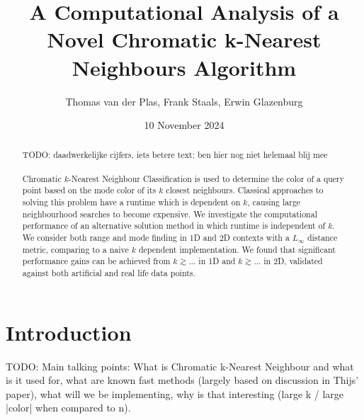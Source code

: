\documentclass{article}
\title{A Computational Analysis of a Novel Chromatic k-Nearest Neighbours Algorithm}
\author{Thomas van der Plas, Frank Staals, Erwin Glazenburg}
\date{10 November 2024}
\begin{document}
\maketitle

\begin{abstract}
    \noindent TODO: daadwerkelijke cijfers, iets betere text; ben hier nog niet helemaal blij mee \\\\
    Chromatic $k$-Nearest Neighbour Classification is used to determine the color of a query point based on the mode color of its $k$ closest neighbours. Classical approaches to solving this problem have a runtime which is dependent on $k$, causing large neighbourhood searches to become expensive. We investigate the computational performance of an alternative solution method in which runtime is independent of $k$. We consider both range and mode finding in 1D and 2D contexts with a $L_\infty$ distance metric, comparing to a naive $k$ dependent implementation. We found that significant performance gains can be achieved from $k \gtrsim ...$ in 1D and $k \gtrsim ...$ in 2D, validated against both artificial and real life data points.
\end{abstract}

\section{Introduction}
TODO: Main talking points: What is Chromatic k-Nearest Neighbour and what is it used for, what are known fast methods (largely based on discussion in Thijs' paper), what will we be implementing, why is that interesting (large k / large |color| when compared to n).
\end{document}
